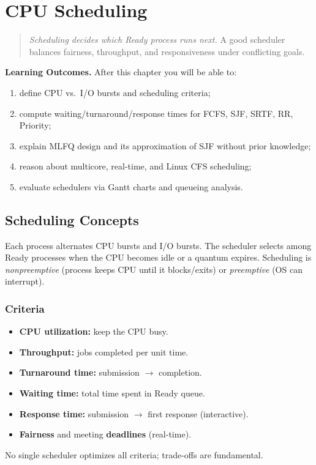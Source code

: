 \chapter{CPU Scheduling}
\label{ch:scheduling}

\begin{quote}
\emph{Scheduling decides which Ready process runs next.} A good scheduler
balances fairness, throughput, and responsiveness under conflicting goals.
\end{quote}

\noindent\textbf{Learning Outcomes.} After this chapter you will be able to:
\begin{enumerate}[label=(L\arabic*)]
  \item define CPU vs.\ I/O bursts and scheduling criteria;
  \item compute waiting/turnaround/response times for FCFS, SJF, SRTF, RR, Priority;
  \item explain MLFQ design and its approximation of SJF without prior knowledge;
  \item reason about multicore, real-time, and Linux CFS scheduling;
  \item evaluate schedulers via Gantt charts and queueing analysis.
\end{enumerate}

\section{Scheduling Concepts}
\label{sec:sched-concepts}

Each process alternates CPU bursts and I/O bursts. The scheduler selects among
Ready processes when the CPU becomes idle or a quantum expires. Scheduling is
\emph{nonpreemptive} (process keeps CPU until it blocks/exits) or
\emph{preemptive} (OS can interrupt).

\subsection{Criteria}
\begin{itemize}
  \item \textbf{CPU utilization:} keep the CPU busy.
  \item \textbf{Throughput:} jobs completed per unit time.
  \item \textbf{Turnaround time:} submission $\to$ completion.
  \item \textbf{Waiting time:} total time spent in Ready queue.
  \item \textbf{Response time:} submission $\to$ first response (interactive).
  \item \textbf{Fairness} and meeting \textbf{deadlines} (real-time).
\end{itemize}
No single scheduler optimizes all criteria; trade-offs are fundamental.

